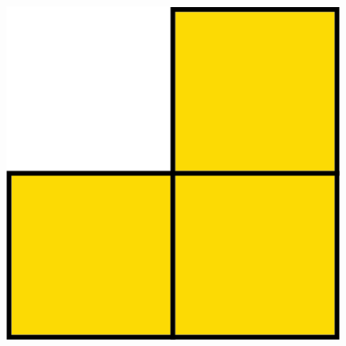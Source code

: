 	\begin{adjustwidth}{0pt}{200pt}
		\begin{thBox}
			\begin{figure}[H]
				\centering
				\vspace*{5pt}
				\captionsetup{labelformat= empty, justification=centering}
				\includegraphics[scale=0.3]{8}
				\vspace*{20pt}
			\end{figure}
		\end{thBox}
	\end{adjustwidth}
	
